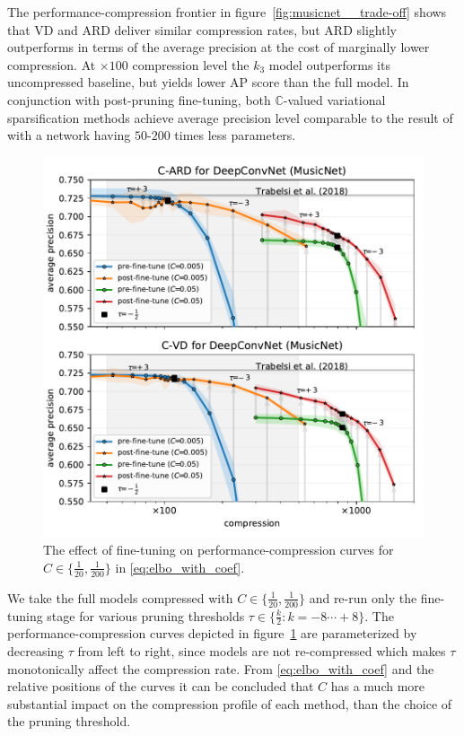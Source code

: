 \documentclass[a4paper,10pt,twocolumn]{article}
\newcommand{\cplx}{\mathbb{C}}
\begin{document}
The performance-compression frontier in figure~\ref{fig:musicnet__trade-off} shows that
VD and ARD deliver similar compression rates, but ARD slightly outperforms in terms of
the average precision at the cost of marginally lower compression.
%
At $\times100$ compression level the $k_3$ model outperforms its
uncompressed baseline, but yields lower AP score than the full model. In conjunction with
post-pruning fine-tuning, both $\cplx$-valued variational sparsification methods achieve
average precision level comparable to the result of \citet{trabelsi_deep_2018} with a
network having $50$-$200$ times less parameters.

\begin{figure}[!t]
  \centering
  \includegraphics[width=1\columnwidth]{figure__musicnet__threshold__C__DeepConvNet.pdf}
  \caption{%
    The effect of fine-tuning on performance-compression curves for $
      C\in \{\tfrac1{20}, \frac1{200}\}
    $ in \eqref{eq:elbo_with_coef}.
  }
  \label{fig:hist__and__threshold__tradeoff}
\end{figure}

We take the full models compressed with $C \in \{\tfrac1{20}, \frac1{200}\}$ and re-run
only the fine-tuning stage for various pruning thresholds $
  \tau \in \{\tfrac{k}2\colon k=-8\cdots+8\}
$. The performance-compression curves depicted in figure~\ref{fig:hist__and__threshold__tradeoff}
are parameterized by decreasing $\tau$ from left to right, since models are not re-compressed
which makes $\tau$ monotonically affect the compression rate. From \eqref{eq:elbo_with_coef}
and the relative positions of the curves it can be concluded that $C$ has a much more
substantial impact on the compression profile of each method, than the choice of the
pruning threshold.
\end{document}

